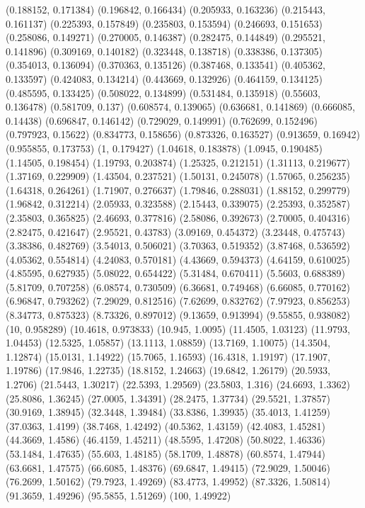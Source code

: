 {(0.188152, 0.171384)
(0.196842, 0.166434)
(0.205933, 0.163236)
(0.215443, 0.161137)
(0.225393, 0.157849)
(0.235803, 0.153594)
(0.246693, 0.151653)
(0.258086, 0.149271)
(0.270005, 0.146387)
(0.282475, 0.144849)
(0.295521, 0.141896)
(0.309169, 0.140182)
(0.323448, 0.138718)
(0.338386, 0.137305)
(0.354013, 0.136094)
(0.370363, 0.135126)
(0.387468, 0.133541)
(0.405362, 0.133597)
(0.424083, 0.134214)
(0.443669, 0.132926)
(0.464159, 0.134125)
(0.485595, 0.133425)
(0.508022, 0.134899)
(0.531484, 0.135918)
(0.55603, 0.136478)
(0.581709, 0.137)
(0.608574, 0.139065)
(0.636681, 0.141869)
(0.666085, 0.14438)
(0.696847, 0.146142)
(0.729029, 0.149991)
(0.762699, 0.152496)
(0.797923, 0.15622)
(0.834773, 0.158656)
(0.873326, 0.163527)
(0.913659, 0.16942)
(0.955855, 0.173753)
(1, 0.179427)
(1.04618, 0.183878)
(1.0945, 0.190485)
(1.14505, 0.198454)
(1.19793, 0.203874)
(1.25325, 0.212151)
(1.31113, 0.219677)
(1.37169, 0.229909)
(1.43504, 0.237521)
(1.50131, 0.245078)
(1.57065, 0.256235)
(1.64318, 0.264261)
(1.71907, 0.276637)
(1.79846, 0.288031)
(1.88152, 0.299779)
(1.96842, 0.312214)
(2.05933, 0.323588)
(2.15443, 0.339075)
(2.25393, 0.352587)
(2.35803, 0.365825)
(2.46693, 0.377816)
(2.58086, 0.392673)
(2.70005, 0.404316)
(2.82475, 0.421647)
(2.95521, 0.43783)
(3.09169, 0.454372)
(3.23448, 0.475743)
(3.38386, 0.482769)
(3.54013, 0.506021)
(3.70363, 0.519352)
(3.87468, 0.536592)
(4.05362, 0.554814)
(4.24083, 0.570181)
(4.43669, 0.594373)
(4.64159, 0.610025)
(4.85595, 0.627935)
(5.08022, 0.654422)
(5.31484, 0.670411)
(5.5603, 0.688389)
(5.81709, 0.707258)
(6.08574, 0.730509)
(6.36681, 0.749468)
(6.66085, 0.770162)
(6.96847, 0.793262)
(7.29029, 0.812516)
(7.62699, 0.832762)
(7.97923, 0.856253)
(8.34773, 0.875323)
(8.73326, 0.897012)
(9.13659, 0.913994)
(9.55855, 0.938082)
(10, 0.958289)
(10.4618, 0.973833)
(10.945, 1.0095)
(11.4505, 1.03123)
(11.9793, 1.04453)
(12.5325, 1.05857)
(13.1113, 1.08859)
(13.7169, 1.10075)
(14.3504, 1.12874)
(15.0131, 1.14922)
(15.7065, 1.16593)
(16.4318, 1.19197)
(17.1907, 1.19786)
(17.9846, 1.22735)
(18.8152, 1.24663)
(19.6842, 1.26179)
(20.5933, 1.2706)
(21.5443, 1.30217)
(22.5393, 1.29569)
(23.5803, 1.316)
(24.6693, 1.3362)
(25.8086, 1.36245)
(27.0005, 1.34391)
(28.2475, 1.37734)
(29.5521, 1.37857)
(30.9169, 1.38945)
(32.3448, 1.39484)
(33.8386, 1.39935)
(35.4013, 1.41259)
(37.0363, 1.4199)
(38.7468, 1.42492)
(40.5362, 1.43159)
(42.4083, 1.45281)
(44.3669, 1.4586)
(46.4159, 1.45211)
(48.5595, 1.47208)
(50.8022, 1.46336)
(53.1484, 1.47635)
(55.603, 1.48185)
(58.1709, 1.48878)
(60.8574, 1.47944)
(63.6681, 1.47575)
(66.6085, 1.48376)
(69.6847, 1.49415)
(72.9029, 1.50046)
(76.2699, 1.50162)
(79.7923, 1.49269)
(83.4773, 1.49952)
(87.3326, 1.50814)
(91.3659, 1.49296)
(95.5855, 1.51269)
(100, 1.49922)
}

